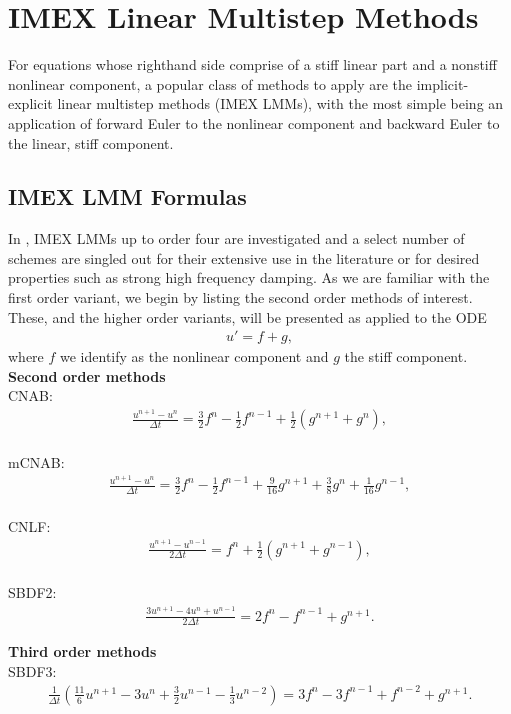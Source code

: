 \chapter{IMEX Linear Multistep Methods}
For equations whose righthand side comprise of a stiff linear part and a nonstiff nonlinear component, a popular class of methods to apply are the implicit-explicit linear multistep methods (IMEX LMMs), with the most simple being an application of forward Euler to the nonlinear component and backward Euler to the linear, stiff component. 

\section{IMEX LMM Formulas}
In \cite{ascher1995implicit}, IMEX LMMs up to order four are investigated and a select number of schemes are singled out for their extensive use in the literature or for desired properties such as strong high frequency damping. As we are familiar with the first order variant, we begin by listing the second order methods of interest. These, and the higher order variants, will be presented as applied to the ODE 
\begin{align*}
u' = f + g, 
\end{align*}
where $f$ we identify as the nonlinear component and $g$ the stiff component. 
\\ \noindent
\textbf{Second order methods}\\
CNAB:
\begin{align}
\frac{u^{n+1}-u^n}{\Delta t} 
= \frac{3}{2} f^n - \frac{1}{2}f^{n-1} 
+ \frac{1}{2}(g^{n+1} + g^n), 
\label{cnab}
\end{align}\\
mCNAB:
\begin{align}
\frac{u^{n+1}-u^n}{\Delta t} 
= \frac{3}{2}f^n - \frac{1}{2} f^{n-1}
+ \frac{9}{16}g^{n+1} 
+ \frac{3}{8}g^n
+ \frac{1}{16}g^{n-1},
\label{mcnab}
\end{align}
\\
CNLF:
\begin{align}
\frac{u^{n+1}-u^{n-1}}{2\Delta t}
= f^n + \frac{1}{2}(g^{n+1} + g^{n-1}),
\label{cnlf}
\end{align} \\
SBDF2:
\begin{align}
\frac{3u^{n+1}-4u^n+u^{n-1}}{2\Delta t} 
= 2f^n - f^{n-1} + g^{n+1}.
\label{sbdf2}
\end{align}

\noindent
\textbf{Third order methods}\\
SBDF3:
\begin{align}
\frac{1}{\Delta t}\left(\frac{11}{6}u^{n+1} - 3u^n + \frac{3}{2}u^{n-1} - \frac{1}{3}u^{n-2} \right) 
= 3f^n - 3f^{n-1} + f^{n-2} + g^{n+1}.
\label{sbdf3}
\end{align}

